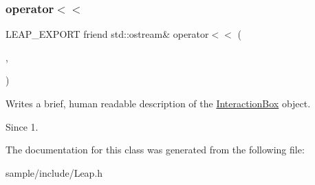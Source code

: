 \subsubsection{\texorpdfstring{operator$<$$<$}{operator<<}}
{\footnotesize\ttfamily L\+E\+A\+P\+\_\+\+E\+X\+P\+O\+RT friend std\+::ostream\& operator$<$$<$ (\begin{DoxyParamCaption}\item[{std\+::ostream \&}]{,  }\item[{const \hyperlink{class_leap_1_1_interaction_box}{Interaction\+Box} \&}]{ }\end{DoxyParamCaption})\hspace{0.3cm}{\ttfamily [friend]}}

Writes a brief, human readable description of the \hyperlink{class_leap_1_1_interaction_box}{Interaction\+Box} object.


\begin{DoxyCodeInclude}
\end{DoxyCodeInclude}


\begin{DoxySince}{Since}
1. 
\end{DoxySince}


The documentation for this class was generated from the following file\+:\begin{DoxyCompactItemize}
\item 
sample/include/Leap.\+h\end{DoxyCompactItemize}
